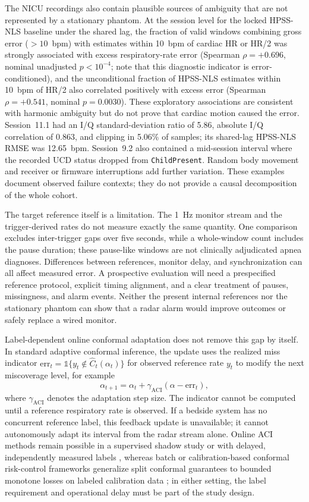 The NICU recordings also contain plausible sources of ambiguity that are not represented by a
stationary phantom. At the session level for the locked HPSS-NLS baseline under the shared lag,
the fraction of valid windows combining gross error ($>10$~bpm) with estimates within 10~bpm of
cardiac HR or HR/2 was strongly associated with excess respiratory-rate error (Spearman
$\rho=+0.696$, nominal unadjusted $p<10^{-4}$; note that this diagnostic indicator is
error-conditioned), and the unconditional fraction of HPSS-NLS estimates within 10~bpm of HR/2
also correlated positively with excess error (Spearman $\rho=+0.541$, nominal $p=0.0030$).
These exploratory associations are consistent with harmonic ambiguity but do not prove that
cardiac motion caused the error. Session~11.1 had an I/Q standard-deviation ratio of 5.86,
absolute I/Q correlation of 0.863, and clipping in 5.06\% of samples; its shared-lag HPSS-NLS
RMSE was 12.65~bpm. Session~9.2 also contained a mid-session interval where the recorded UCD
status dropped from \texttt{ChildPresent}. Random body movement and receiver or firmware interruptions add further
variation. These examples document observed failure contexts; they do not provide a causal
decomposition of the whole cohort.

The target reference itself is a limitation. The 1~Hz monitor stream and the trigger-derived
rates do not measure exactly the same quantity. One comparison excludes inter-trigger gaps over
five seconds, while a whole-window count includes the pause duration; these pause-like windows
are not clinically adjudicated apnea diagnoses. Differences between references, monitor delay,
and synchronization can all affect measured error. A prospective evaluation will need a
prespecified reference protocol, explicit timing alignment, and a clear treatment of pauses,
missingness, and alarm events. Neither the present internal references nor the stationary
phantom can show that a radar alarm would improve outcomes or safely replace a wired monitor.

Label-dependent online conformal adaptation does not remove this gap by itself. In standard
adaptive conformal inference, the update uses the realized miss indicator
$\mathrm{err}_t=\mathbb{1}\{y_t\notin\widehat{C}_t(\alpha_t)\}$ for observed reference rate
$y_t$ to modify the next miscoverage level, for example
\[
  \alpha_{t+1}=\alpha_t+\gamma_{\mathrm{ACI}}(\alpha-\mathrm{err}_t),
\]
where $\gamma_{\mathrm{ACI}}$ denotes the adaptation step size. The indicator cannot be computed
until a reference respiratory rate is observed. If a bedside system has no concurrent reference
label, this feedback update is unavailable; it cannot autonomously adapt its interval from the
radar stream alone. Online ACI methods remain possible in a supervised shadow study or with
delayed, independently measured labels \citep{gibbs2024conformal}, whereas batch or
calibration-based conformal risk-control frameworks generalize split conformal guarantees to
bounded monotone losses on labeled calibration data \citep{angelopoulos2024conformal}; in
either setting, the label requirement and operational delay must be part of the study design.

